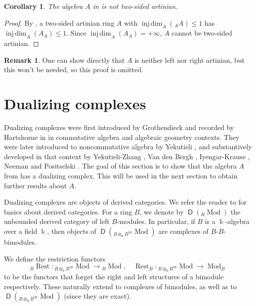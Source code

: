 \documentclass{amsart}
\newtheorem{cor}[equation]{Corollary}
\theoremstyle{definition}
\newtheorem{rem}[equation]{Remark}
\newcommand{\opn}{\operatorname}
\newcommand{\cat}[1]{\operatorname{\mathsf{#1}}}
\renewcommand{\k}{\Bbbk}
\newcommand{\injdim}{\operatorname{inj\,dim}}
\newcommand{\restlb}{{}_B \opn{Rest}}
\newcommand{\restrb}{\opn{Rest}_B}
\numberwithin{equation}{section}
\begin{document}
\begin{cor}
The algebra $A$ in  is not two-sided artinian.    
\end{cor}
\begin{proof}
By \cite[Corollary]{Ho}, a two-sided artinian ring $A$ with $\injdim_A({}_A A) \le 1$ has $\injdim_A(A_A) \le 1$. 
Since $\injdim_A(A_A) = +\infty$, $A$ cannot be two-sided artinian.
\end{proof}

\begin{rem}
One can show directly that $A$ is neither left nor right artinian,
but this won't be needed, so this proof is omitted.
\end{rem}

\section{Dualizing complexes}\label{sec:dual}

Dualizing complexes were first introduced by Grothendieck and recorded by Hartshorne in \cite{RD} in commutative algebra and algebraic geometry contexts.
They were later introduced to noncommutative algebra by Yekutieli \cite{Yek},
and substantively developed in that context by Yekutieli-Zhang \cite{YZ1,YZ2}, Van den Bergh \cite{vdb}, Iyengar-Krause \cite{InKr}, Neeman \cite{Neeflat} and Positselski \cite{Pos}. The goal of this section is to show that the algebra $A$ from  has a dualizing complex.
This will be used in the next section to obtain further results about $A$.

Dualizing complexes are objects of derived categories. We refer the reader to \cite{KelBook,YeBook} for basics about derived categories.
For a ring $B$, we denote by $\cat{D}({}_B \opn{Mod})$ the unbounded derived category of left $B$-modules.
In particular, if $B$ is a $\k$-algebra over a field $\k$,
then objects of $\cat{D}({}_{B\otimes_{\k} B^{\opn{op}}} \opn{Mod})$ are complexes of $B$-$B$-bimodules.

We define the restriction functors 
\begin{equation}\label{eqn:Restf}
\restlb: {}_{B\otimes_{\k} B^{\opn{op}}}\opn{Mod} \to {}_B \opn{Mod}, \quad
\restrb: {}_{B\otimes_{\k} B^{\opn{op}}}\opn{Mod} \to \opn{Mod}_B
\end{equation}
to be the functors that forget the right and left structures of a bimodule respectively.
These naturally extend to complexes of bimodules, as well as to $\cat{D}({}_{B\otimes_{\k} B^{\opn{op}}} \opn{Mod})$ (since they are exact).
\end{document}
